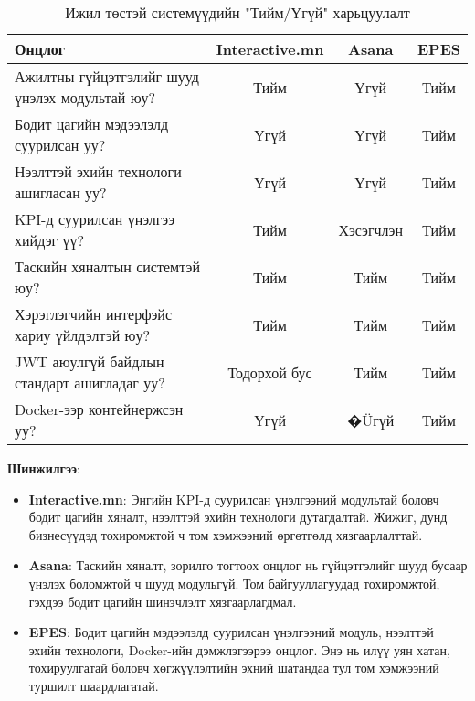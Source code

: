 \begin{table}[H]
\centering
\small
\begin{tabular}{|>{\raggedright\arraybackslash}p{4cm}|c|c|c|}
\hline
\textbf{Онцлог} & \textbf{Interactive.mn} & \textbf{Asana} & \textbf{EPES} \\
\hline
Ажилтны гүйцэтгэлийг шууд үнэлэх модультай юу? & Тийм & Үгүй & Тийм \\
\hline
Бодит цагийн мэдээлэлд суурилсан уу? & Үгүй & Үгүй & Тийм \\
\hline
Нээлттэй эхийн технологи ашигласан уу? & Үгүй & Үгүй & Тийм \\
\hline
KPI-д суурилсан үнэлгээ хийдэг үү? & Тийм & Хэсэгчлэн & Тийм \\
\hline
Таскийн хяналтын системтэй юу? & Тийм & Тийм & Тийм \\
\hline
Хэрэглэгчийн интерфэйс хариу үйлдэлтэй юу? & Тийм & Тийм & Тийм \\
\hline
JWT аюулгүй байдлын стандарт ашигладаг уу? & Тодорхой бус & Тийм & Тийм \\
\hline
Docker-ээр контейнержсэн уу? & Үгүй & �Üгүй & Тийм \\
\hline
\end{tabular}
\caption{Ижил төстэй системүүдийн "Тийм/Үгүй" харьцуулалт}
\label{tab:yes_no_comparison}
\end{table}

\textbf{Шинжилгээ}:
\begin{itemize}
    \item \textbf{Interactive.mn}: Энгийн KPI-д суурилсан үнэлгээний модультай боловч бодит цагийн хяналт, нээлттэй эхийн технологи дутагдалтай. Жижиг, дунд бизнесүүдэд тохиромжтой ч том хэмжээний өргөтгөлд хязгаарлалттай.
    \item \textbf{Asana}: Таскийн хяналт, зорилго тогтоох онцлог нь гүйцэтгэлийг шууд бусаар үнэлэх боломжтой ч шууд модульгүй. Том байгууллагуудад тохиромжтой, гэхдээ бодит цагийн шинэчлэлт хязгаарлагдмал.
    \item \textbf{EPES}: Бодит цагийн мэдээлэлд суурилсан үнэлгээний модуль, нээлттэй эхийн технологи, Docker-ийн дэмжлэгээрээ онцлог. Энэ нь илүү уян хатан, тохируулгатай боловч хөгжүүлэлтийн эхний шатандаа тул том хэмжээний туршилт шаардлагатай.
\end{itemize}